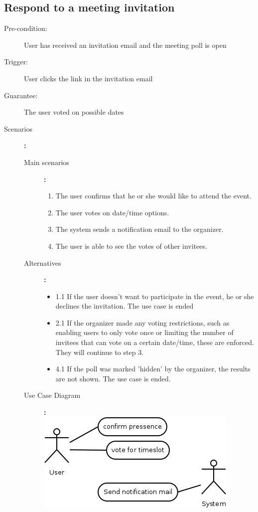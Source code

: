 \subsection{Respond to a meeting invitation}

\begin{description}
	\item[Pre-condition:] User has received an invitation email and the meeting poll is open
	\item[Trigger:] User clicks the link in the invitation email
	\item[Guarantee:] The user voted on possible dates
	\item[Scenarios]\textbf{:}\\
				\begin{description}
					\item[Main scenarios]\textbf{:}\\
								\begin{enumerate}
									\item The user confirms that he or she would like to attend the event.
									\item The user votes on date/time options.
									\item The system sends a notification email to the organizer.
									\item The user is able to see the votes of other invitees.
								\end{enumerate}
					\item[Alternatives]\textbf{:}\\
								\begin{itemize}
									\item 1.1 If the user doesn't want to participate in the event, he or she declines the invitation.	The use case is ended
									\item 2.1 If the organizer made any voting restrictions, such as enabling users to only vote once or limiting the number of invitees that can vote on a certain date/time, these are enforced. They will continue to step 3.
									\item 4.1 If the poll was marked 'hidden' by the organizer, the results are not shown. The use case is ended.
								\end{itemize}
					\item[Use Case Diagram]\textbf{:}\\
						\includegraphics[scale=0.5]{ucd/Diagram2.png}
				\end{description}
\end{description}

